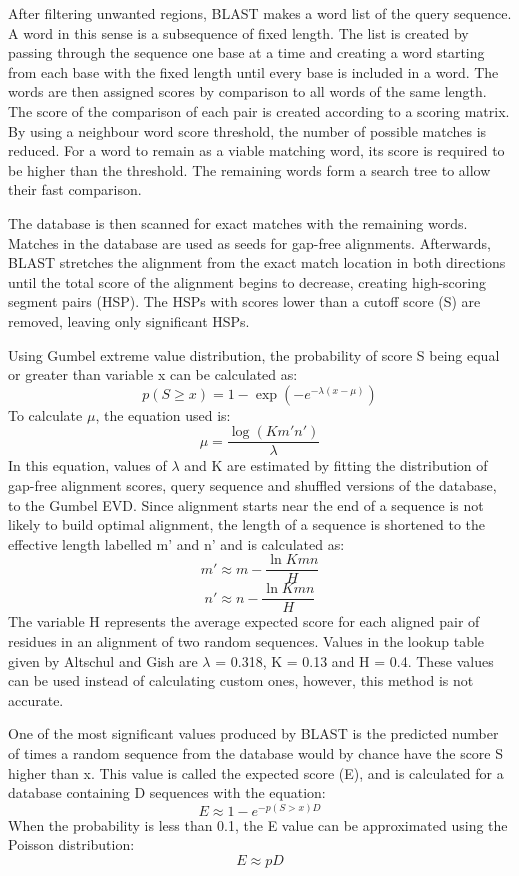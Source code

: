 After filtering unwanted regions, BLAST makes a word list of the query sequence. A word in this sense is a subsequence of fixed length. The list is created by passing through the sequence one base at a time and creating a word starting from each base with the fixed length until every base is included in a word. The words are then assigned scores by comparison to all words of the same length. The score of the comparison of each pair is created according to a scoring matrix. By using a neighbour word score threshold, the number of possible matches is reduced. For a word to remain as a viable matching word, its score is required to be higher than the threshold. The remaining words form a search tree to allow their fast comparison.

The database is then scanned for exact matches with the remaining words. Matches in the database are used as seeds for gap-free alignments. Afterwards, BLAST stretches the alignment from the exact match location in both directions until the total score of the alignment begins to decrease, creating high-scoring segment pairs (HSP). The HSPs with scores lower than a cutoff score (S) are removed, leaving only significant HSPs.

Using Gumbel extreme value distribution, the probability of score S being equal or greater than variable x can be calculated as:
\[ p(S \geq x) = 1 - \exp(-e^{-\lambda(x-\mu)}) \]
To calculate $\mu$, the equation used is:
\[ \mu = \frac{\log(K m' n')}{\lambda} \]
In this equation, values of $\lambda$ and K are estimated by fitting the distribution of gap-free alignment scores, query sequence and shuffled versions of the database, to the Gumbel EVD. Since alignment starts near the end of a sequence is not likely to build optimal alignment, the length of a sequence is shortened to the effective length labelled m' and n' and is calculated as:
\[ m' \approx m - \frac{\ln K m n}{H} \]
\[n' \approx n - \frac{\ln K m n}{H}\]
The variable H represents the average expected score for each aligned pair of residues in an alignment of two random sequences. Values in the lookup table given by Altschul and Gish are $\lambda$ = 0.318, K = 0.13 and H = 0.4. These values can be used instead of calculating custom ones, however, this method is not accurate.

One of the most significant values produced by BLAST is the predicted number of times a random sequence from the database would by chance have the score S higher than x. This value is called the expected score (E), and is calculated for a database containing D sequences with the equation:
\[ E \approx 1 - e^{-p(S>x) D} \]
When the probability is less than 0.1, the E value can be approximated using the Poisson distribution:
\[ E \approx p D \]

